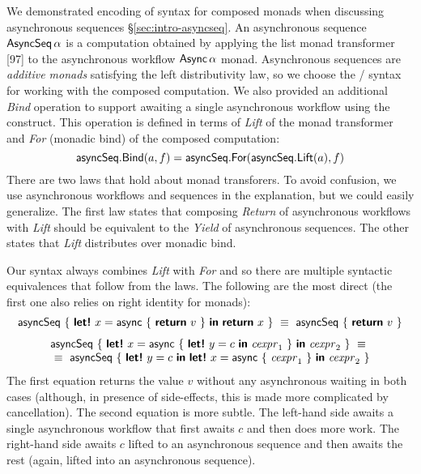 \documentclass[runningheads,a4paper]{llncs}
\begin{document}
We demonstrated encoding of syntax for composed monads when discussing
asynchronous sequences \S\ref{sec:intro-asyncseq}. An asynchronous sequence $\textnormal{\sffamily AsyncSeq}\,\alpha$ 
is a computation obtained by applying the list monad transformer [97] to the asynchronous
workflow $\textnormal{\sffamily Async}\,\alpha$ monad. Asynchronous sequences are \emph{additive monads} satisfying 
the left distributivity law, so we choose the / syntax for working with 
the composed computation. We also provided an additional \emph{Bind} operation to support 
awaiting a single asynchronous workflow using the  construct. This operation is
defined in terms of \emph{Lift} of the monad transformer and \emph{For} (monadic bind) of the
composed computation:
%
\begin{equation*}
\ident{asyncSeq}.\ident{Bind}(a, f) = \ident{asyncSeq}.\ident{For}(\ident{asyncSeq}.\ident{Lift}(a), f)
\end{equation*}
%
There are two laws that hold about monad transforers. To avoid confusion, we use asynchronous 
workflows and sequences in the explanation, but we could easily generalize. The first law states 
that composing \emph{Return} of asynchronous workflows with \emph{Lift} should be equivalent to the 
\emph{Yield} of asynchronous sequences. The other states that \emph{Lift} distributes over monadic
bind. 

Our syntax always combines \emph{Lift} with \emph{For} and so there are multiple syntactic 
equivalences that follow from the laws. The following are the most direct (the first one also
relies on right identity for monads):
%
\begin{equation*}
\begin{array}{c}
\ident{asyncSeq}~\{~ \kvd{let!}~x = \ident{async}~\{~\kvd{return}~v~\}~\kvd{in}~\kvd{return}~x ~\} ~\equiv~
  \ident{asyncSeq}~\{~ \kvd{return}~v ~\}
\\[0.7em]
\ident{asyncSeq}~\{~ \kvd{let!}~x = \ident{async}~\{~\kvd{let!}~y = c~\kvd{in}~\cexpr_1~\}~\kvd{in}~\cexpr_2 ~\} ~\equiv~\\
~\equiv~ \ident{asyncSeq}~\{~ \kvd{let!}~y = c~\kvd{in}~\kvd{let!}~x = \ident{async}~\{~\cexpr_1~\}~\kvd{in}~\cexpr_2 ~\}
\end{array}
\end{equation*}
%
The first equation returns the value $v$ without any asynchronous waiting in both cases
(although, in presence of side-effects, this is made more complicated by cancellation). 
The second equation is more subtle. The left-hand side awaits a single asynchronous workflow 
that first awaits $c$ and then does more work. The right-hand side awaits $c$ lifted to an 
asynchronous sequence and then awaits the rest (again, lifted into an asynchronous sequence).
\end{document}
